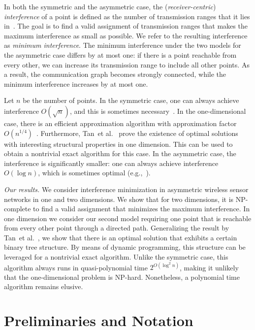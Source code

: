 \documentclass[envcountsect,envcountsame,runningheads,a4paper]{llncs}
\renewcommand{\paragraph}[1]{\smallskip\noindent\textit{#1}}
\begin{document}
In both the symmetric and the asymmetric case, the
(\emph{receiver-centric}) \emph{interference}
of a point is defined as the number of transmission
ranges that it lies in~\cite{RickenbachWaZo09}. The goal is to find a
valid assignment of transmission ranges that makes the maximum interference
as small as possible. We refer to the resulting interference as \emph{minimum interference}.
The minimum interference under the two models for the 
asymmetric case differs by at most one: if there is a point reachable 
from every other, we can increase its transmission range to 
include all other points. As a result, the communication 
graph becomes strongly connected, while the minimum 
interference increases by at most one.

Let $n$ be the number of points.
In the symmetric case,
one can always achieve interference
$O(\sqrt{n})$, and this is sometimes necessary~\cite{HalldorssonTo08,
RickenbachWaZo09}. In the one-dimensional case, there is an
efficient approximation algorithm with
approximation factor $O(n^{1/4})$~\cite{RickenbachWaZo09}.
Furthermore,
Tan~et al.~\cite{TanLoWaHuLa11}
prove the existence of optimal solutions
with interesting structural properties in one dimension.
This can be used to obtain a nontrivial exact algorithm for
this case.
In the asymmetric case, the interference is significantly smaller:
one can always achieve interference $O(\log n)$, which is sometimes
optimal (e.g.,~\cite{Korman12}).

\paragraph{Our results.}
We consider interference minimization in asymmetric wireless
sensor networks in one and two dimensions. We show that for
two dimensions, it is NP-complete to find a valid
assignment that minimizes the maximum interference.
In one dimension we consider our second model requiring
one point that is reachable from
every other point through a directed path.
 Generalizing the
result by Tan~et al.~\cite{TanLoWaHuLa11}, we show that
there is an optimal solution that
exhibits a certain binary tree structure. By means of
dynamic programming, this structure can
be leveraged for a nontrivial exact algorithm. Unlike the
symmetric case, this algorithm always runs in quasi-polynomial
time $2^{O(\log^2 n)}$, making it unlikely that the
one-dimensional problem is NP-hard.
Nonetheless, a polynomial time algorithm remains elusive.


\section{Preliminaries and Notation}
\end{document}
